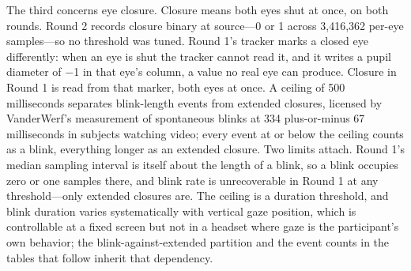 The third concerns eye closure. Closure means both eyes shut at once, on both rounds. Round 2
records closure binary at source---0 or 1 across 3,416,362 per-eye samples---so no threshold
was tuned. Round 1's tracker marks a closed eye differently: when an eye is shut the tracker
cannot read it, and it writes a pupil diameter of $-$1 in that eye's column, a value no real
eye can produce. Closure in Round 1 is read from that marker, both eyes at once. A ceiling of
500 milliseconds separates blink-length events from extended closures, licensed by
VanderWerf's measurement of spontaneous blinks at 334 plus-or-minus 67 milliseconds in
subjects watching video; every event at or below the ceiling counts as a blink, everything
longer as an extended closure. Two limits attach. Round 1's median sampling interval is
itself about the length of a blink, so a blink occupies zero or one samples there, and blink
rate is unrecoverable in Round 1 at any threshold---only extended closures are. The ceiling
is a duration threshold, and blink duration varies systematically with vertical gaze
position, which is controllable at a fixed screen but not in a headset where gaze is the
participant's own behavior; the blink-against-extended partition and the event counts in the
tables that follow inherit that dependency.
